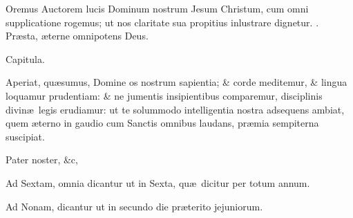 \documentclass[letter,11pt]{book}
\makeatletter
\DeclareRobustCommand{\Rbar}{\vers@resp{0pt}{R}}
\newcommand{\vers@resp@sym}{\raisebox{0.2ex}{\rotatebox[origin=c]{-20}{$\m@th\rceil$}}}
\newcommand{\vers@resp}[2]{%
  {\ooalign{\hidewidth\kern#1\vers@resp@sym\hidewidth\cr#2\cr}}%
}%
\def\R{\color{Red} \Rbar . \color{black}}
\makeatother
\begin{document}
\begin{multicols*}{2}
Oremus Auctorem lucis Dominum nostrum Jesum Christum, cum omni supplicatione rogemus; ut nos claritate sua propitius inlustrare dignetur.
\R Pr\ae sta, \ae terne omnipotens Deus.

Capitula.

Aperiat, qu\ae sumus, Domine os nostrum sapientia; \& corde meditemur, \& lingua loquamur prudentiam: \& ne jumentis insipientibus comparemur, disciplinis divin\ae \ legis erudiamur: ut te solummodo intelligentia nostra adsequens ambiat, quem \ae terno in gaudio cum Sanctis omnibus laudans, pr\ae mia sempiterna suscipiat.

Pater noster, \&c,

Ad Sextam, omnia dicantur ut in Sexta, qu\ae \ dicitur per totum annum.

Ad Nonam, dicantur ut in secundo die pr\ae terito jejuniorum.



\end{multicols*}
\end{document}
